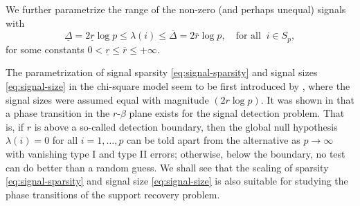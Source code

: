 We further parametrize the range of the non-zero (and perhaps unequal) signals with
\begin{equation} \label{eq:signal-size}
    \underline{\Delta} = 2\underline{r}\log{p}
    \le \lambda(i) \le
    \overline{\Delta} = 2\overline{r}\log{p}, \quad \text{for all}\;\;i\in S_p,
\end{equation}
for some constants $0<\underline{r}\le\overline{r}\le+\infty$.

\begin{remark}
\label{rmk:global-test-boundary}
The parametrization of signal sparsity \eqref{eq:signal-sparsity} and signal sizes  \eqref{eq:signal-size} in the chi-square model seem to be first introduced by \citet{donoho2004higher}, where the signal sizes were assumed equal with magnitude $(2{r}\log{p})$.
It was shown in \cite{donoho2004higher} that a phase transition in the $r$-$\beta$ plane exists for the signal detection problem. 
That is, if $r$ is above a so-called detection boundary, then the global null hypothesis $\lambda(i)=0$ for all $i=1,\ldots,p$ can be told apart from the alternative as $p\to\infty$ with vanishing type I and type II errors; 
otherwise, below the boundary, no test can do better than a random guess.
We shall see that the scaling of sparsity \eqref{eq:signal-sparsity} and signal size \eqref{eq:signal-size} is also suitable for studying the phase transitions of the support recovery problem.
\end{remark}


